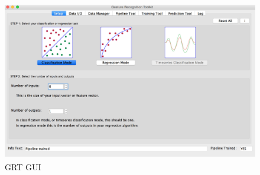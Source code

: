 \begin{figure}
	[h] \centering 
	\includegraphics[height=7cm]{figures/content/grt-gui.jpg} \caption{GRT GUI} \label{fg:grt:gui} 
\end{figure}
